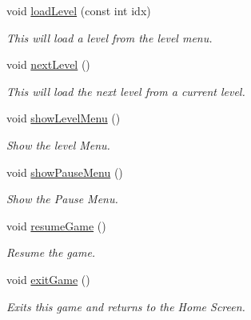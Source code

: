 \begin{DoxyCompactItemize}
void \hyperlink{class_b_scene_a7256ae33cbfbda2999f33626a4fa93ac}{load\-Level} (const int idx)
\begin{DoxyCompactList}\small\item\em \-This will load a level from the level menu. \end{DoxyCompactList}\item 
void \hyperlink{class_b_scene_a41bf719fb615e92dc092a18dc47b919b}{next\-Level} ()
\begin{DoxyCompactList}\small\item\em \-This will load the next level from a current level. \end{DoxyCompactList}\item 
void \hyperlink{class_b_scene_a98a3fdedfb94c433624c0ce664adb343}{show\-Level\-Menu} ()
\begin{DoxyCompactList}\small\item\em \-Show the level \-Menu. \end{DoxyCompactList}\item 
void \hyperlink{class_b_scene_a2817197ebb69c55473bd50808a66a27f}{show\-Pause\-Menu} ()
\begin{DoxyCompactList}\small\item\em \-Show the \-Pause \-Menu. \end{DoxyCompactList}\item 
void \hyperlink{class_b_scene_aa90fdc62093e8c1a8ad454b95015ee2e}{resume\-Game} ()
\begin{DoxyCompactList}\small\item\em \-Resume the game. \end{DoxyCompactList}\item 
void \hyperlink{class_b_scene_a8c547547d6a90ab1e2ae5abc3805c3f2}{exit\-Game} ()
\begin{DoxyCompactList}\small\item\em \-Exits this game and returns to the \-Home \-Screen. \end{DoxyCompactList}\end{DoxyCompactItemize}
